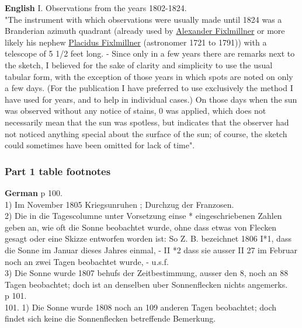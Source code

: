 \documentclass[12pt]{article}
\begin{document}
\textbf{English}
I. Observations from the years 1802-1824.\\

"The instrument with which observations were usually made until 1824 was a Branderian azimuth quadrant (already used by \href{https://de.wikipedia.org/wiki/Alexander_Fixlmillner}{Alexander Fixlmillner} or more likely his nephew \href{https://en.wikipedia.org/wiki/Placidus_Fixlmillner}{Placidus Fixlmillner} (astronomer 1721 to 1791)) with a telescope of 5 1/2 feet long. - Since only in a few years there are remarks next to the sketch, I believed for the sake of clarity and simplicity to use the usual tabular form, with the exception of those years in which spots are noted on only a few days. (For the publication I have preferred to use exclusively the method I have used for years, and to help in individual cases.) On those days when the sun was observed without any notice of stains, 0 was applied, which does not necessarily mean that the sun was spotless, but indicates that the observer had not noticed anything special about the surface of the sun; of course, the sketch could sometimes have been omitted for lack of time".\\

\subsubsection{Part 1 table footnotes}\label{mitt:rub 684 part 1 footnotes}
\textbf{German}
p 100.\\
1) Im November 1805 Kriegsunruhen ; Durchzug der Franzosen. \\

2) Die in die Tagescolumne unter Vorsetzung einse * eingeschriebenen Zahlen geben an, wie oft die Sonne beobachtet wurde, ohne dass etwas von Flecken gesagt oder eine Skizze entworfen worden ist: So Z. B. bezeichnet 1806 I*1, dass die Sonne im Januar dieses Jahres einmal, - II *2 dass sie ausser II 27 im Februar noch an zwei Tagen beobachtet wurde, - u.s.f.\\

3) Die Sonne wurde 1807 behufs der Zeitbestimmung, ausser den 8, noch an 88 Tagen beobachtet; doch ist an denselben uber Sonnenflecken nichts angemerks.\\

p 101.\\
101. 
1) Die Sonne wurde 1808 noch an 109 anderen Tagen beobachtet; doch findet sich keine die Sonnenflecken betreffende Bemerkung. \\
\end{document}
